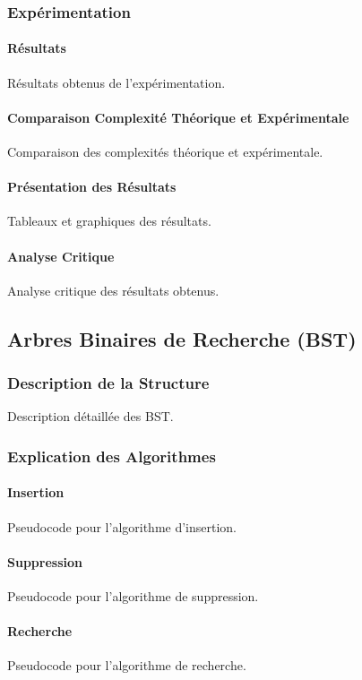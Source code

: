 \documentclass[a4paper, 12pt]{article}
\begin{document}
\subsubsection{Expérimentation}
\paragraph{Résultats}
Résultats obtenus de l'expérimentation.

\paragraph{Comparaison Complexité Théorique et Expérimentale}
Comparaison des complexités théorique et expérimentale.

\paragraph{Présentation des Résultats}
Tableaux et graphiques des résultats.

\paragraph{Analyse Critique}
Analyse critique des résultats obtenus.

\subsection{Arbres Binaires de Recherche (BST)}
\subsubsection{Description de la Structure}
Description détaillée des BST.

\subsubsection{Explication des Algorithmes}
\paragraph{Insertion}
Pseudocode pour l'algorithme d'insertion.

\paragraph{Suppression}
Pseudocode pour l'algorithme de suppression.

\paragraph{Recherche}
Pseudocode pour l'algorithme de recherche.
\end{document}
